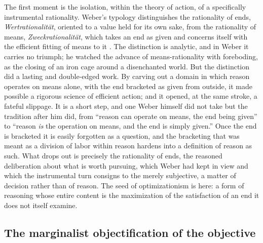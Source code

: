 The first moment is the isolation, within the theory of action, of a specifically instrumental rationality. Weber's typology distinguishes the rationality of ends, \emph{Wertrationalität}, oriented to a value held for its own sake, from the rationality of means, \emph{Zweckrationalität}, which takes an end as given and concerns itself with the efficient fitting of means to it \parencite{weber1978economy}. The distinction is analytic, and in Weber it carries no triumph; he watched the advance of means-rationality with foreboding, as the closing of an iron cage around a disenchanted world. But the distinction did a lasting and double-edged work. By carving out a domain in which reason operates on means alone, with the end bracketed as given from outside, it made possible a rigorous science of efficient action; and it opened, at the same stroke, a fateful slippage. It is a short step, and one Weber himself did not take but the tradition after him did, from ``reason can operate on means, the end being given'' to ``reason \emph{is} the operation on means, and the end is simply given.'' Once the end is bracketed it is easily forgotten as a question, and the bracketing that was meant as a division of labor within reason hardens into a definition of reason as such. What drops out is precisely the rationality of ends, the reasoned deliberation about what is worth pursuing, which Weber had kept in view and which the instrumental turn consigns to the merely subjective, a matter of decision rather than of reason. The seed of optimizationism is here: a form of reasoning whose entire content is the maximization of the satisfaction of an end it does not itself examine.

\subsection*{The marginalist objectification of the objective}

